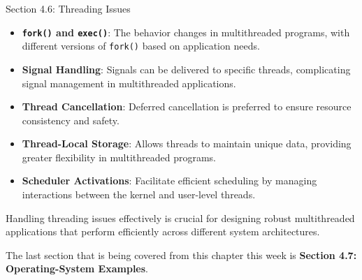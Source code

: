 \begin{notes}{Section 4.6: Threading Issues}
\begin{highlight}
    \end{highlight}
    
    \begin{highlight}
    
        \begin{itemize}
            \item \textbf{\texttt{fork()} and \texttt{exec()}}: The behavior changes in multithreaded programs, with different versions of \texttt{fork()} based on application needs.
            \item \textbf{Signal Handling}: Signals can be delivered to specific threads, complicating signal management in multithreaded applications.
            \item \textbf{Thread Cancellation}: Deferred cancellation is preferred to ensure resource consistency and safety.
            \item \textbf{Thread-Local Storage}: Allows threads to maintain unique data, providing greater flexibility in multithreaded programs.
            \item \textbf{Scheduler Activations}: Facilitate efficient scheduling by managing interactions between the kernel and user-level threads.
        \end{itemize}
    
    Handling threading issues effectively is crucial for designing robust multithreaded applications that perform efficiently across different system architectures.
    
    \end{highlight}
\end{notes}

The last section that is being covered from this chapter this week is \textbf{Section 4.7: Operating-System Examples}.

